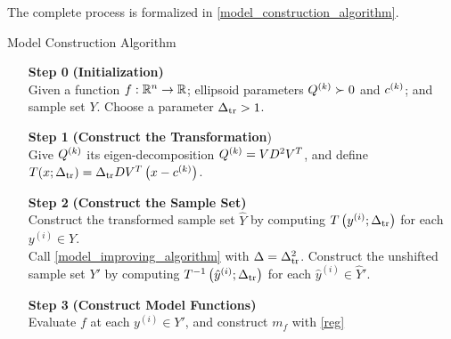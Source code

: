 \documentclass{article}
\begin{document}
The complete process is formalized in \cref{model_construction_algorithm}.


{
\begin{fullwidth}[leftmargin=0in, rightmargin=0in, width=\linewidth-0.5in]
\begin{flushleft}

\begin{algorithm}[H]
    \caption{Model Construction Algorithm}
    \label{model_construction_algorithm}
    \begin{itemize}
        \item[\textbf{Step 0}] \textbf{(Initialization)} \\
			Given a function $f : \mathbb R^n \to \mathbb R$;
			ellipsoid parameters ${Q^{(k)}} \succ 0$ and $c^{(k)}$;
        	and sample set $Y$.
        	Choose a parameter $\Delta_{\textrm{tr}} > 1$.
        \item[\textbf{Step 1}] \textbf{(Construct the Transformation}) \\
        	Give ${Q^{(k)}}$ its eigen-decomposition ${Q^{(k)}} = VD^2V^T$, and define
			$T(x; \Delta_{\textrm{tr}}) = \Delta_{\textrm{tr}} D V^T\left(x - c^{(k)}\right)$.
        \item[\textbf{Step 2}] \textbf{(Construct the Sample Set)} \\
        Construct the transformed sample set $\hat Y$ by computing $T\left(y^{(i)}; \Delta_{\textrm{tr}}\right)$ for each $y^{(i)} \in Y$. \\
        Call \cref{model_improving_algorithm} with $\Delta = \Delta_{\textrm{tr}}^2$.
        Construct the unshifted sample set $Y'$ by computing $T^{-1}\left(\hat y^{(i)}; \Delta_{\textrm{tr}}\right)$ for each $\hat y^{(i)} \in \hat Y'$.
        \item[\textbf{Step 3}] \textbf{(Construct Model Functions)} \\
        Evaluate $f$ at each $y^{(i)} \in Y'$, and construct $m_f$ with \cref{reg}
    \end{itemize}
\end{algorithm}


\end{flushleft}
\end{fullwidth}
}
\end{document}
